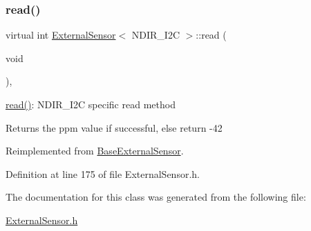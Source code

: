 \subsubsection{\texorpdfstring{read()}{read()}}
{\footnotesize\ttfamily virtual int \hyperlink{class_external_sensor}{External\+Sensor}$<$ N\+D\+I\+R\+\_\+\+I2C $>$\+::read (\begin{DoxyParamCaption}\item[{void}]{ }\end{DoxyParamCaption})\hspace{0.3cm}{\ttfamily [inline]}, {\ttfamily [virtual]}}

\hyperlink{class_external_sensor_3_01_n_d_i_r___i2_c_01_4_add67f5ecaf47d2ee675e8299aee7322d}{read()}\+: N\+D\+I\+R\+\_\+\+I2C specific read method

\begin{DoxyReturn}{Returns}
the ppm value if successful, else return -\/42 
\end{DoxyReturn}


Reimplemented from \hyperlink{class_base_external_sensor_a7e0a98f350148d7645031315657aa5ec}{Base\+External\+Sensor}.



Definition at line 175 of file External\+Sensor.\+h.



The documentation for this class was generated from the following file\+:\begin{DoxyCompactItemize}
\item 
\hyperlink{_external_sensor_8h}{External\+Sensor.\+h}\end{DoxyCompactItemize}
